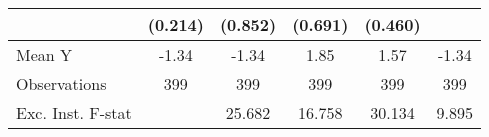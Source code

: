 {\begin{tabular}{l*{5}{c}}
            &     (0.214)         &     (0.852)         &     (0.691)         &     (0.460)         &                     \\
\midrule
Mean Y      &       -1.34         &       -1.34         &        1.85         &        1.57         &       -1.34         \\
Observations&         399         &         399         &         399         &         399         &         399         \\
Exc. Inst. F-stat&                     &      25.682         &      16.758         &      30.134         &       9.895         \\
\bottomrule
\end{tabular}
}
